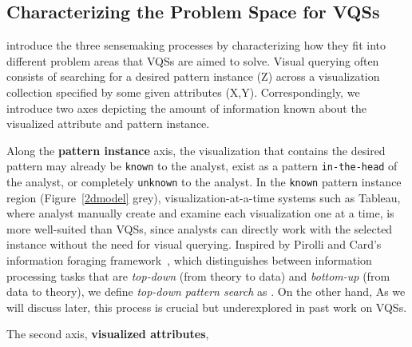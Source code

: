 \subsection{Characterizing the Problem Space for VQSs}
 introduce the three sensemaking processes by characterizing how they fit into different problem areas that VQSs are aimed to solve. Visual querying often consists of searching for a desired pattern instance (Z) across a visualization collection specified by some given attributes (X,Y). Correspondingly, we introduce two axes depicting the amount of information known about the visualized attribute and pattern instance.%
\par Along the \textbf{pattern instance} axis,
the visualization that contains
the desired pattern may already be \texttt{known} to the analyst,
exist as a pattern \texttt{in-the-head} of the analyst,
or  completely \texttt{unknown} to the analyst.
In the \texttt{known} pattern instance region (Figure~\ref{2dmodel} grey), visualization-at-a-time systems such as Tableau,
where analyst manually create and examine each visualization one at a time,
is more well-suited than VQSs, since analysts can directly work with the selected instance without the need for visual querying.
Inspired by Pirolli and Card's information
foraging framework~\cite{Pirolli}, which distinguishes
between information processing tasks that are \textit{top-down}
(from theory to data) and \textit{bottom-up} (from data to theory),
we define \textit{top-down pattern search} as . On the other hand,  As we will discuss later, this process is crucial but underexplored in past work on VQSs.
\par The second axis, \textbf{visualized attributes},
